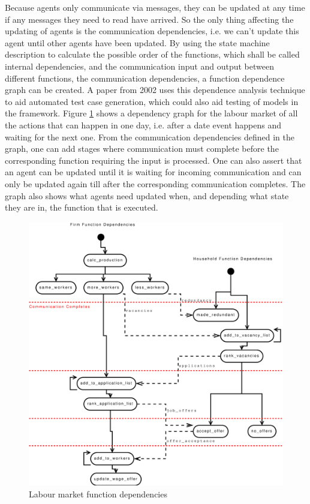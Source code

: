 \documentclass[a4paper,11pt]{article}
\begin{document}
Because agents only communicate via messages, they can be updated
at any time if any messages they need to read have
arrived. So the only thing affecting the updating of agents is the
communication dependencies, i.e. we can't update this agent until other agents have been updated.
By using the state machine
description to calculate the possible order of the functions, which
shall be called internal dependencies, and the communication input
and output between different functions, the communication
dependencies, a function dependence graph can be created.
A paper \cite{566188} from 2002 uses this dependence analysis technique to aid automated test case generation, which could also aid testing of models in the framework.
Figure \ref{fig:labour_fd} shows a dependency graph
for the labour market of all the actions that can happen in one day,
i.e. after a date event happens and waiting for the next one. From
the communication dependencies defined in the graph, one can add
stages where communication must complete before the corresponding
function requiring the input is processed. One can also assert that
an agent can be updated until it is waiting for incoming
communication and can only be updated again till after the
corresponding communication completes. The graph also shows what
agents need updated when, and depending what state they are in, the
function that is executed.

\begin{figure}
\begin{center}
\includegraphics*[width=6.0in]{labour_market_dependencies.eps}
\caption{Labour market function dependencies} \label{fig:labour_fd}
\end{center}
\end{figure}
\end{document}
